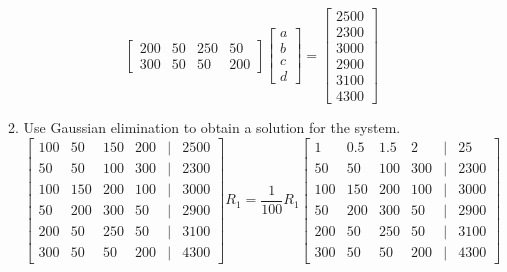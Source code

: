 \documentclass[11pt]{article}
\begin{document}
\begin{enumerate}
\begin{enumerate}
\[\begin{bmatrix}
        200 & 50 & 250 & 50 \\
        300 & 50 & 50 & 200
    \end{bmatrix}
    \begin{bmatrix}
        a \\
        b \\
        c \\
        d
    \end{bmatrix}
    = \begin{bmatrix}
        2500 \\
        2300 \\
        3000 \\
        2900 \\
        3100 \\
        4300
    \end{bmatrix}
\]
\item Use Gaussian elimination to obtain a solution for the system.
\[
    \begin{bmatrix}
        100 & 50 & 150 & 200 &|& 2500 \\
        50 & 50 & 100 & 300 &|& 2300 \\
        100 & 150 & 200 & 100 &|& 3000 \\
        50 & 200 & 300 & 50 &|& 2900 \\
        200 & 50 & 250 & 50 &|& 3100 \\
        300 & 50 & 50 & 200 &|& 4300
    \end{bmatrix}
    R_1 = \frac{1}{100}R_1
    \begin{bmatrix}
        1 & 0.5 & 1.5 & 2 &|& 25 \\
        50 & 50 & 100 & 300 &|& 2300 \\
        100 & 150 & 200 & 100 &|& 3000 \\
        50 & 200 & 300 & 50 &|& 2900 \\
        200 & 50 & 250 & 50 &|& 3100 \\
        300 & 50 & 50 & 200 &|& 4300
    \end{bmatrix}
\]


\end{enumerate}
\end{enumerate}
\end{document}
